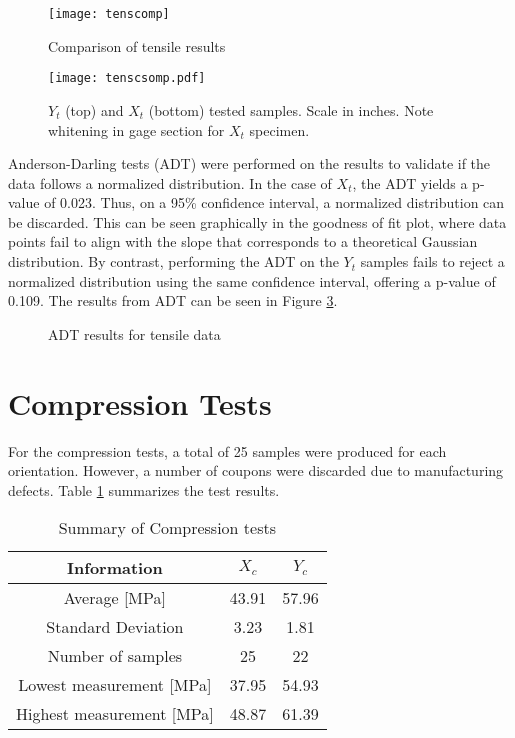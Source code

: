 \documentclass[main.tex]{subfiles}
\begin{document}
\begin{figure}[h]
	\center
	\texttt{[image: tenscomp]}
	\caption{Comparison of tensile results} \label{fig:tensComp}
\end{figure}

\begin{figure}[!htbp]
	\center
	\texttt{[image: tenscsomp.pdf]}
	\captionsetup{justification=centering} %
	\caption[$X_t$ and $Y_t$ tested samples]{$Y_t$ (top) and $X_t$ (bottom) tested samples. Scale in inches. Note whitening in gage section for $X_t$ specimen.} \label{fig:tensSComp}
\end{figure}

Anderson-Darling tests (ADT) were performed on the results to validate if the data follows a normalized distribution. In the case of $X_t$, the ADT yields a p-value of 0.023. Thus, on a 95\% confidence interval, a normalized distribution can be discarded. This can be seen graphically in the goodness of fit plot, where data points fail to align with the slope that corresponds to a theoretical Gaussian distribution. By contrast, performing the ADT on the $Y_t$ samples fails to reject a normalized distribution using the same confidence interval, offering a p-value of 0.109. %
The results from ADT can be seen in Figure \ref{fig:adttens}.

\begin{figure}[!htbp]
	\center
	\hfill
	\caption{ADT results for tensile data} \label{fig:adttens}
\end{figure}

\pagebreak
      
\section{Compression Tests} \label{sec:compr}
For the compression tests, a total of 25 samples were produced for each orientation. However, a number of coupons were discarded due to manufacturing defects. Table \ref{tab:comprtab} summarizes the test results.  

\begin{table} [h]
	\centering
	\caption{Summary of Compression tests}%
	\begin{tabular}{ c| c c } 
		\toprule
		\textbf{Information} & $X_c$ & $Y_c$\\
		\midrule
		Average [MPa] &43.91  & 57.96\\
		Standard Deviation &3.23  & 1.81\\
		Number of samples &25  & 22\\
		Lowest measurement [MPa] &37.95 &54.93 \\
		Highest measurement [MPa] &48.87 &61.39 \\
		\bottomrule
	\end{tabular}
\label{tab:comprtab}
\end{table}
\end{document}
